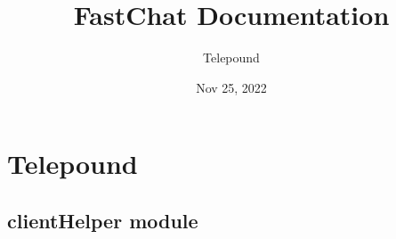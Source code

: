 \documentclass[letterpaper,10pt,english]{sphinxmanual}
\title{FastChat Documentation}
\date{Nov 25, 2022}
\author{Telepound}
\begin{document}
\pagestyle{empty}
\sphinxmaketitle
\pagestyle{plain}
\sphinxtableofcontents
\pagestyle{normal}
\label{\detokenize{index::doc}}



\chapter{Telepound}
\label{\detokenize{modules:telepound}}\label{\detokenize{modules::doc}}

\section{clientHelper module}
\label{\detokenize{clientHelper:module-clientHelper}}\label{\detokenize{clientHelper:clienthelper-module}}\label{\detokenize{clientHelper::doc}}
\end{document}
